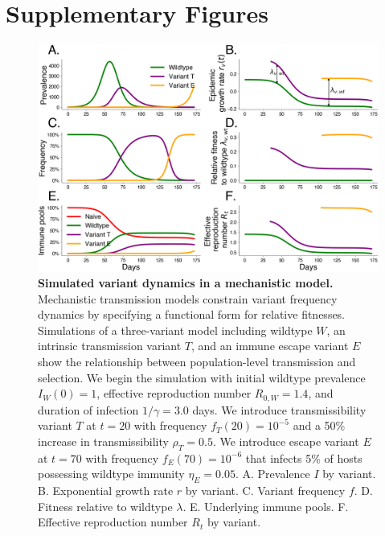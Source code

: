 \documentclass[11pt,oneside,letterpaper]{article}
\newcommand{\wt}{W}
\newcommand{\varEscape}{\eta}
\newcommand{\varTransmission}{\rho}
\begin{document}
\newpage

\section*{Supplementary Figures}


\begin{figure}[h]
    \centering
    \includegraphics[width=1.0\linewidth]{./figures/vis_mechanisms.png}
    \caption{
      \textbf{Simulated variant dynamics in a mechanistic model.}
      Mechanistic transmission models constrain variant frequency dynamics by specifying a functional form for relative fitnesses.
      Simulations of a three-variant model including wildtype $W$, an intrinsic transmission variant $T$, and an immune escape variant $E$ show the relationship between population-level transmission and selection.
      We begin the simulation with initial wildtype prevalence $I_\wt(0) = 1$, effective reproduction number $R_{0,\wt} = 1.4$, and duration of infection $1/\gamma = 3.0$ days.
      We introduce transmissibility variant $T$ at $t=20$ with frequency $f_T(20) = 10^{-5}$ and a 50\% increase in transmissibility $\varTransmission_T = 0.5$.
      We introduce escape variant $E$ at $t=70$ with frequency $f_E(70) = 10^{-6}$ that infects 5\% of hosts possessing wildtype immunity $\varEscape_E = 0.05$.
      A. Prevalence $I$ by variant.
      B. Exponential growth rate $r$ by variant.
      C. Variant frequency $f$.
      D. Fitness relative to wildtype $\lambda$.
      E. Underlying immune pools.
      F. Effective reproduction number $R_t$ by variant.
    }
    \label{fig:vis_mechanisms}
\end{figure}
\end{document}
